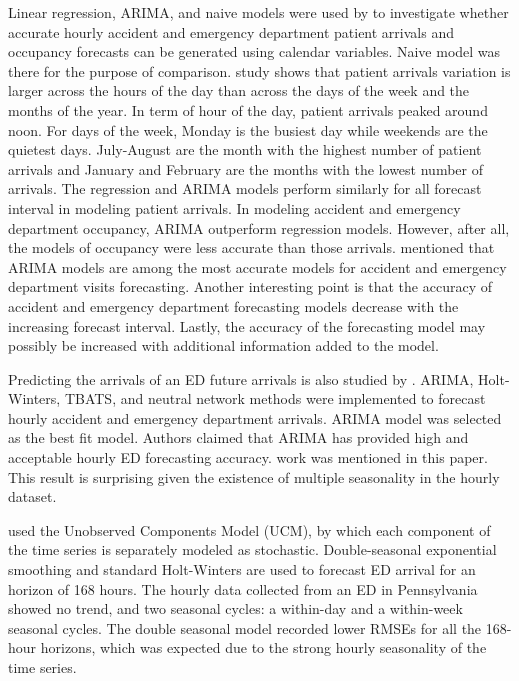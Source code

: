 \documentclass[]{elsarticle} %
\begin{document}
Linear regression, ARIMA, and naive models were used by \citet{hertzum2017forecasting} to investigate whether accurate hourly accident and emergency department patient arrivals and occupancy forecasts can be generated using calendar variables. Naive model was there for the purpose of comparison. \citet{hertzum2017forecasting} study shows that patient arrivals variation is larger across the hours of the day than across the days of the week and the months of the year. In term of hour of the day, patient arrivals peaked around noon. For days of the week, Monday is the busiest day while weekends are the quietest days. July-August are the month with the highest number of patient arrivals and January and February are the months with the lowest number of arrivals. The regression and ARIMA models perform similarly for all forecast interval in modeling patient arrivals. In modeling accident and emergency department occupancy, ARIMA outperform regression models. However, after all, the models of occupancy were less accurate than those arrivals. \citet{hertzum2017forecasting} mentioned that ARIMA models are among the most accurate models for accident and emergency department visits forecasting. Another interesting point is that the accuracy of accident and emergency department forecasting models decrease with the increasing forecast interval. Lastly, the accuracy of the forecasting model may possibly be increased with additional information added to the model.

Predicting the arrivals of an ED future arrivals is also studied by \citet{choudhury2020forecasting}. ARIMA, Holt-Winters, TBATS, and neutral network methods were implemented to forecast hourly accident and emergency department arrivals. ARIMA model was selected as the best fit model. Authors claimed that ARIMA has provided high and acceptable hourly ED forecasting accuracy. \citet{hertzum2017forecasting} work was mentioned in this paper. This result is surprising given the existence of multiple seasonality in the hourly dataset.

\citet{morzuch2006forecasting} used the Unobserved Components Model (UCM), by which each component of the time series is separately modeled as stochastic. Double-seasonal exponential smoothing and standard Holt-Winters are used to forecast ED arrival for an horizon of 168 hours. The hourly data collected from an ED in Pennsylvania showed no trend, and two seasonal cycles: a within-day and a within-week seasonal cycles. The double seasonal model recorded lower RMSEs for all the 168-hour horizons, which was expected due to the strong hourly seasonality of the time series.
\end{document}
